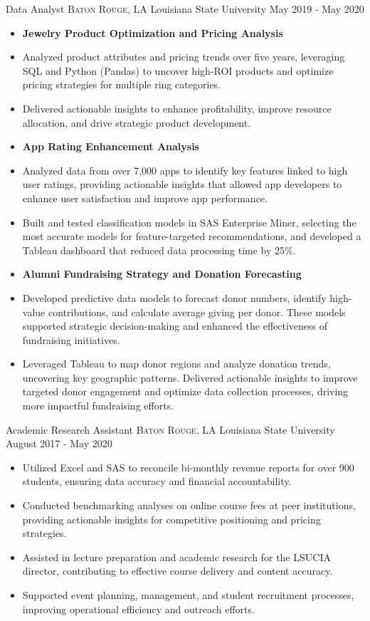 \documentclass[10pt,a4paper]{article}
\begin{document}
\headedsection
{Data Analyst}
{{\small \textsc{Baton Rouge, LA}}}
{Louisiana State University}
{May 2019 - May 2020}
{
    \begin{itemize}
      \item[] \textbf{Jewelry Product Optimization and Pricing Analysis}
      \item Analyzed product attributes and pricing trends over five years, leveraging SQL and Python (Pandas) to uncover high-ROI products and optimize pricing strategies for multiple ring categories.
       \item Delivered actionable insights to enhance profitability, improve resource allocation, and drive strategic product development.
        \item[] \textbf{App Rating Enhancement Analysis}
        \item Analyzed data from over 7,000 apps to identify key features linked to high user ratings, providing actionable insights that allowed app developers to enhance user satisfaction and improve app performance.
        \item Built and tested classification models in SAS Enterprise Miner, selecting the most accurate models for feature-targeted recommendations, and developed a Tableau dashboard that reduced data processing time by 25\%.
        \item[] \textbf{Alumni Fundraising Strategy and Donation Forecasting}
        \item Developed predictive data models to forecast donor numbers, identify high-value contributions, and calculate average giving per donor. These models supported strategic decision-making and enhanced the effectiveness of fundraising initiatives.
        \item Leveraged Tableau to map donor regions and analyze donation trends, uncovering key geographic patterns. Delivered actionable insights to improve targeted donor engagement and optimize data collection processes, driving more impactful fundraising efforts.
     \end{itemize}
}

\headedsection
{Academic Research Assistant}
{{\small \textsc{Baton Rouge, LA}}}
{Louisiana State University}
{August 2017 - May 2020}
{
    \begin{itemize}
      \item Utilized Excel and SAS to reconcile bi-monthly revenue reports for over 900 students, ensuring data accuracy and financial accountability.
      \item Conducted benchmarking analyses on online course fees at peer institutions, providing actionable insights for competitive positioning and pricing strategies.
      \item Assisted in lecture preparation and academic research for the LSUCIA director, contributing to effective course delivery and content accuracy.
      \item Supported event planning, management, and student recruitment processes, improving operational efficiency and outreach efforts.
    \end{itemize}
}
\end{document}
